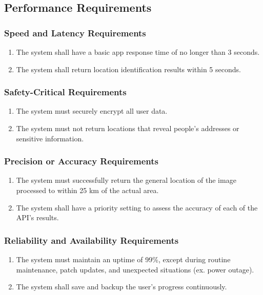 \documentclass[]{article}
\begin{document}

\subsection{Performance Requirements}
\label{sub:performance_requirements}

\subsubsection{Speed and Latency Requirements}
\label{ssub:speed_and_latency_requirements}
\begin{enumerate}[{PR-SL}1. ]
	\item The system shall have a basic app response time of no longer than 3 seconds.
	\item The system shall return location identification results within 5 seconds.
\end{enumerate}

\subsubsection{Safety-Critical Requirements}
\label{ssub:safety_critical_requirements}
\begin{enumerate}[{PR-SC}1. ]
	\item The system must securely encrypt all user data.
	\item The system must not return locations that reveal people's addresses or sensitive information.
\end{enumerate}

\subsubsection{Precision or Accuracy Requirements}
\label{ssub:precision_or_accuracy_requirements}
\begin{enumerate}[{PR-PA}1. ]
	\item The system must successfully return the general location of the image processed to within 25 km of the actual area.
	\item The system shall have a priority setting to assess the accuracy of each of the API's results.
\end{enumerate}

\subsubsection{Reliability and Availability Requirements}
\label{ssub:reliability_and_availability_requirements}
\begin{enumerate}[{PR-RA}1. ]
	\item The system must maintain an uptime of 99\%, except during routine maintenance, patch updates, and unexpected situations (ex. power outage).
	\item The system shall save and backup the user's progress continuously.
\end{enumerate}
\end{document}
